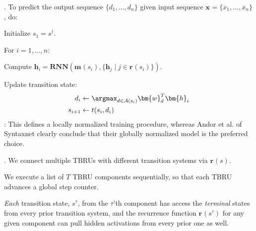\documentclass[11pt]{article}
\renewcommand\vec[2][]{\bm{#2}_{#1}}
\newcommand\myspace[1][]{\vspace{#1\bigskipamount}}
\newcommand\p{\Needspace{10\baselineskip} \noindent}
\begin{document}
\myspace
\p {}. To predict the output sequence $\{d_1, \ldots, d_n\}$ given input sequence $\vec{x} = \{x_1, \ldots, x_n\}$, do:
\begin{compactenum}
	\item Initialize $s_1 = s^{\dagger}$. 
	\item For $i = 1, \ldots, n$:
	\begin{compactenum}
		\item Compute $\vec[i]{h} = \mathbf{RNN}(\vec{m}(s_i), \{  \vec[j]{h} \mid j \in \vec{r}(s_i)    \}  )$. 
		
		\item Update transition state:
		\begin{align}
			d_i &\leftarrow \argmax_{d \in \mathcal{A}(s_i)} \vec[d]{w}^T \vec[i]{h} \\
			s_{i+1} &\leftarrow t(s_i, d_i)
		\end{align}
		: This defines a locally normalized training procedure, whereas Andor et al. of Syntaxnet clearly conclude that their globally normalized model is the preferred choice.
	\end{compactenum}
\end{compactenum}


\myspace
\p {}. We connect multiple TBRUs with different transition systems via $\vec{r}(s)$. 
\begin{compactenum}
	\item We execute a list of $T$ TBRU components sequentially, so that each TBRU advances a global step counter.
	\item \textit{Each} transition state, $s^{\tau}$, from the $\tau$'th component has access the \textit{terminal} states from every prior transition system, and the recurrence function $\vec{r}(s^{\tau})$ for any given component can pull hidden activations from every prior one as well.
\end{compactenum}
\end{document}
